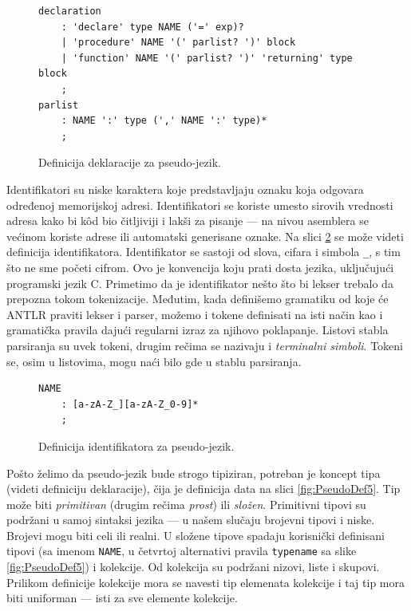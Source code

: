 \begin{figure}[h!]
\begin{lstlisting}[language={}]
declaration
    : 'declare' type NAME ('=' exp)? 
    | 'procedure' NAME '(' parlist? ')' block 
    | 'function' NAME '(' parlist? ')' 'returning' type block 
    ;
parlist
    : NAME ':' type (',' NAME ':' type)*
    ;
\end{lstlisting}
\caption{Definicija deklaracije za pseudo-jezik.}
\label{fig:PseudoDef3}
\end{figure}

Identifikatori su niske karaktera koje predstavljaju oznaku koja odgovara određenoj memorijskoj adresi. Identifikatori se koriste umesto sirovih vrednosti adresa kako bi k\^od bio čitljiviji i lakši za pisanje --- na nivou asemblera se većinom koriste adrese ili automatski generisane oznake. Na slici \ref{fig:PseudoDef4} se može videti definicija identifikatora. Identifikator se sastoji od slova, cifara i simbola \texttt{\_}, s tim što ne sme početi cifrom. Ovo je konvencija koju prati dosta jezika, uključujući programski jezik C. Primetimo da je identifikator nešto što bi lekser trebalo da prepozna tokom tokenizacije. Međutim, kada definišemo gramatiku od koje će ANTLR praviti lekser i parser, možemo i tokene definisati na isti način kao i gramatička pravila dajući regularni izraz za njihovo poklapanje. Listovi stabla parsiranja su uvek tokeni, drugim rečima se nazivaju i \emph{terminalni simboli}. Tokeni se, osim u listovima, mogu naći bilo gde u stablu parsiranja.

\begin{figure}[h!]
\begin{lstlisting}[language={}]
NAME
    : [a-zA-Z_][a-zA-Z_0-9]*
    ;
\end{lstlisting}
\caption{Definicija identifikatora za pseudo-jezik.}
\label{fig:PseudoDef4}
\end{figure}

Pošto želimo da pseudo-jezik bude strogo tipiziran, potreban je koncept tipa (videti definiciju deklaracije), čija je definicija data na slici \ref{fig:PseudoDef5}. Tip može biti \emph{primitivan} (drugim rečima \emph{prost}) ili \emph{složen}. Primitivni tipovi su podržani u samoj sintaksi jezika --- u našem slučaju brojevni tipovi i niske. Brojevi mogu biti celi ili realni. U složene tipove spadaju korisnički definisani tipovi (sa imenom \texttt{NAME}, u četvrtoj alternativi pravila \texttt{typename} sa slike \ref{fig:PseudoDef5}) i kolekcije. Od kolekcija su podržani nizovi, liste i skupovi. Prilikom definicije kolekcije mora se navesti tip elemenata kolekcije i taj tip mora biti uniforman --- isti za sve elemente kolekcije. 

